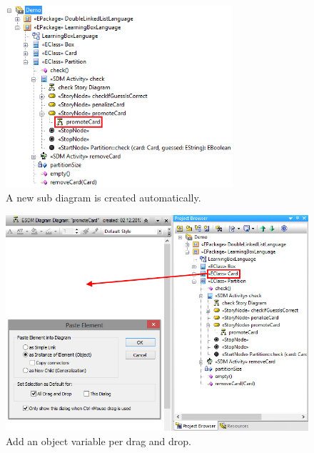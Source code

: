 \begin{figure}[htbp]
\begin{center}
  \includegraphics[width=0.75\textwidth]{pics/sdmBilder/check/sdm_new_storypattern_diagram.png}
  \caption{A new sub diagram is created automatically.}
  \label{fig:sdm_new_sub_diagram}
\end{center}
\end{figure}

\begin{figure}[htbp]
\begin{center}
  \includegraphics[width=\textwidth]{pics/sdmBilder/check/sdm22RAW}
  \caption{Add an object variable per drag and drop.}
  \label{fig:sdm_check_bound_card}
\end{center}
\end{figure}

